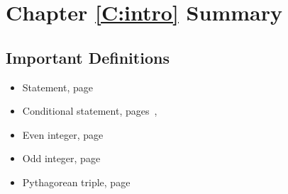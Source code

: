 
\section{Chapter \ref{C:intro} Summary} \label{Su:intro}

\subsection*{Important Definitions}
\begin{multicols}{2}
\begin{itemize}
\item Statement, page~\pageref{D:prop}
\item Conditional statement, pages~\pageref{PA:prop}, ~\pageref{D:conditional}
\item Even integer, page~\pageref{D:even}
\item Odd integer, page~\pageref{D:even}
\item Pythagorean triple, page~\pageref{exer:pythag}
\end{itemize}
\end{multicols}


